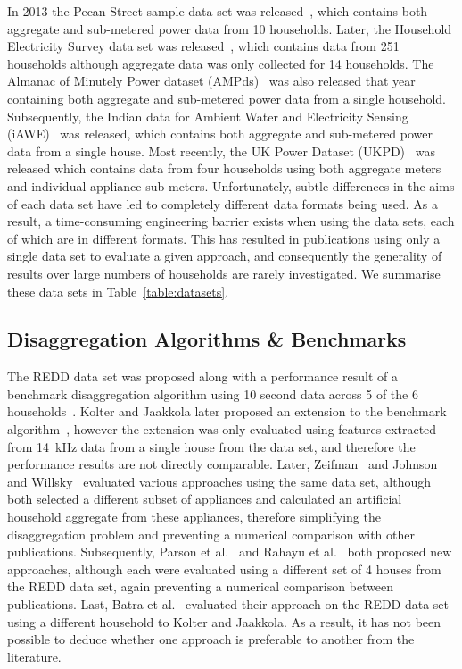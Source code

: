 \documentclass{sig-alternate}
\newcommand{\bluecolor}[1]{\textcolor{blue}{#1}}
\newcommand{\tabref}[1]{Table~\ref{#1}}
\begin{document}
In 2013 the Pecan Street sample data set was released~\cite{pecan}, which contains both aggregate and sub-metered power data from 10 households. Later, the Household Electricity Survey data set was released~\cite{hes}, which contains data from 251 households although aggregate data was only collected for 14 households. The Almanac of Minutely Power dataset (AMPds)~\cite{ampds} was also released that year containing both aggregate and sub-metered power data from a single household. Subsequently, the Indian data for Ambient Water and Electricity Sensing (iAWE)~\cite{iawe} was released, which contains both aggregate and sub-metered power data from a single house. Most recently, the UK Power Dataset (UKPD)~\cite{ukpd} was released which contains data from four households using both aggregate meters and individual appliance sub-meters. Unfortunately, subtle differences in the aims of each data set have led to completely different data formats being used. As a result, a time-consuming engineering barrier exists when using the data sets, each of which are in different formats. This has resulted in publications using only a single data set to evaluate a given approach, and consequently the generality of results over large numbers of households are rarely investigated. We summarise these data sets in \tabref{table:datasets}.

\subsection{Disaggregation Algorithms \& Benchmarks}
\label{sec:algorithms}
\noindent The REDD data set was proposed along with a performance result of a benchmark disaggregation algorithm using 10 second data across 5 of the 6 households~\cite{redd}. Kolter and Jaakkola later proposed an extension to the benchmark algorithm~\cite{kolter_2012}, however the extension was only evaluated using features extracted from 14~kHz data from a single house from the data set, and therefore the performance results are not directly comparable. Later, Zeifman~\cite{zeifman_2012} and Johnson and Willsky~\cite{johnson_2013} evaluated various approaches using the same data set, although both selected a different subset of appliances and calculated an artificial household aggregate from these appliances, therefore simplifying the disaggregation problem and preventing a numerical comparison with other publications. Subsequently, Parson et al.~\cite{parson_2012} and Rahayu et al.~\cite{rahayu_2012} both proposed new approaches, although each were evaluated using a different set of 4 houses from the REDD data set, again preventing a numerical comparison between publications. Last, Batra et al.~\cite{batra_2013} evaluated their approach on the REDD data set using a different household to Kolter and Jaakkola. As a result, it has not been possible to deduce whether one approach is preferable to another from the literature.
\end{document}
